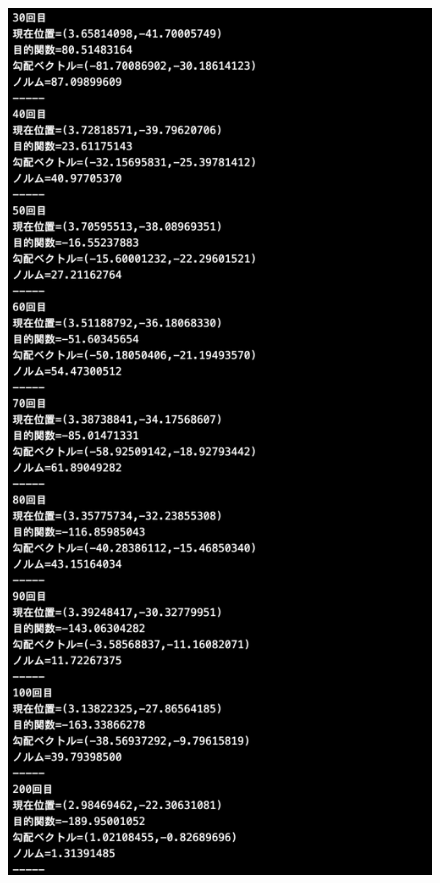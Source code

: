 \documentclass[12pt]{jarticle}
\begin{document}
\begin{figure}[h]
    \begin{minipage}{0.5\hsize}
        \begin{center}
            \includegraphics[scale=0.2]{kadai1_2s_out3_2_2.png}
        \end{center}

\end{minipage}
\end{figure}
\end{document}
